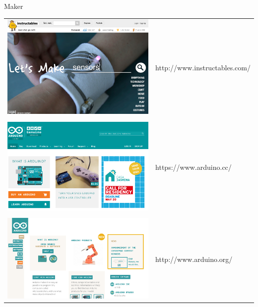\documentclass[11pt]{beamer}
\begin{document}
\begin{frame}[t]{Maker}\footnotesize
\begin{tabular}{c l}
\includegraphics[width=0.3\textheight]{./image/98_04.png}&http://www.instructables.com/\\ &\\
\includegraphics[width=0.3\textheight]{./image/98_05.png}&https://www.arduino.cc/\\ & \\
\includegraphics[width=0.3\textheight]{./image/98_06.png}&http://www.arduino.org/
\end{tabular}
\end{frame}
\end{document}

